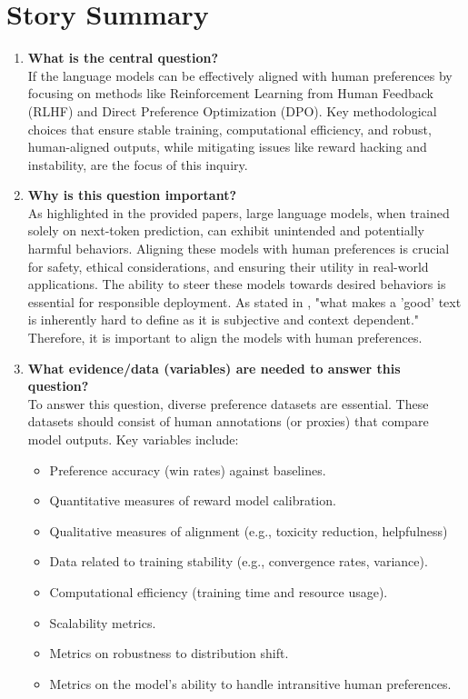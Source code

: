 \documentclass[a4paper,oneside,10pt,ngerman,english]{scrartcl}
\begin{document}


\section{Story Summary}
\label{sec:storysummary}

\begin{enumerate}
    \item \textbf{What is the central question?} \\
    If the language models can be effectively aligned with human preferences by focusing on methods like Reinforcement Learning from Human Feedback (RLHF) and Direct Preference Optimization (DPO). Key methodological choices that ensure stable training, computational efficiency, and robust, human-aligned outputs, while mitigating issues like reward hacking and instability, are the focus of this inquiry.

    \item \textbf{Why is this question important?} \\
    As highlighted in the provided papers, large language models, when trained solely on next-token prediction, can exhibit unintended and potentially harmful behaviors. Aligning these models with human preferences is crucial for safety, ethical considerations, and ensuring their utility in real-world applications. The ability to steer these models towards desired behaviors is essential for responsible deployment. As stated in \cite{lambert2022illustrating}, "what makes a 'good' text is inherently hard to define as it is subjective and context dependent." Therefore, it is important to align the models with human preferences.

    \item \textbf{What evidence/data (variables) are needed to answer this question?} \\
    To answer this question, diverse preference datasets are essential. These datasets should consist of human annotations (or proxies) that compare model outputs. Key variables include:
    \begin{itemize}
        \item Preference accuracy (win rates) against baselines.
        \item Quantitative measures of reward model calibration.
        \item Qualitative measures of alignment (e.g., toxicity reduction, helpfulness)
        \item Data related to training stability (e.g., convergence rates, variance).
        \item Computational efficiency (training time and resource usage).
        \item Scalability metrics.
        \item Metrics on robustness to distribution shift. 
        \item Metrics on the model's ability to handle intransitive human preferences. 
    \end{itemize}


\end{enumerate}
\end{document}
